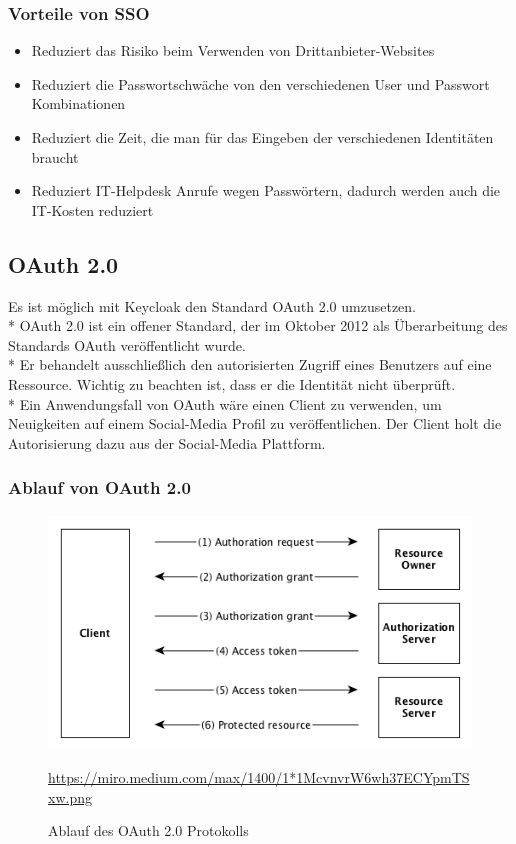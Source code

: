 \subsubsection{Vorteile von SSO}
\begin{itemize}
    \item Reduziert das Risiko beim Verwenden von Drittanbieter-Websites
    \item Reduziert die Passwortschwäche von den verschiedenen User und Passwort Kombinationen
    \item Reduziert die Zeit, die man für das Eingeben der verschiedenen Identitäten braucht
    \item Reduziert IT-Helpdesk Anrufe wegen Passwörtern, dadurch werden auch die IT-Kosten reduziert \cite{KeycloakMakeIT}
\end{itemize}

\subsection{OAuth 2.0}
Es ist möglich mit Keycloak den Standard OAuth 2.0 umzusetzen. \\*
OAuth 2.0 ist ein offener Standard, der im Oktober 2012 als Überarbeitung des Standards OAuth veröffentlicht wurde. \\*
Er behandelt ausschließlich den autorisierten Zugriff eines Benutzers auf eine Ressource. Wichtig zu beachten ist, dass er die Identität nicht überprüft. \\*
Ein Anwendungsfall von OAuth wäre einen Client zu verwenden, um Neuigkeiten auf einem Social-Media Profil zu veröffentlichen. Der Client holt die Autorisierung dazu aus der Social-Media Plattform. \cite{OAuthIonos} \cite{KeycloakCodeCentric}
\pagebreak

\subsubsection{Ablauf von OAuth 2.0}
\begin{figure}[htp]
    \centering
    \includegraphics[scale=0.8]{pics/Ablauf_OAuth2.png}
    \caption{Ablauf des OAuth 2.0 Protokolls}
    \small \url{https://miro.medium.com/max/1400/1*1McvnvrW6wh37ECYpmTSxw.png} 
    \label{fig:impl:OAuth2Protocoll}
\end{figure}

